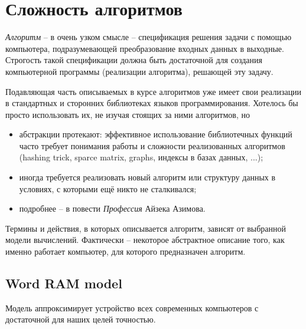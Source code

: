 \chapter{Сложность алгоритмов}

{\em Алгоритм} -- в очень узком смысле -- спецификация решения задачи с помощью компьютера, подразумевающей преобразование входных данных в выходные. Строгость такой спецификации должна быть достаточной для создания компьютерной программы (реализации алгоритма), решающей эту задачу.

Подавляющая часть описываемых в курсе алгоритмов уже имеет свои реализации в стандартных и сторонних библиотеках языков программирования. Хотелось бы просто использовать их, не изучая стоящих за ними алгоритмов, но
\begin{itemize}
  \item абстракции протекают: эффективное использование библиотечных функций часто требует понимания работы и сложности реализованных алгоритмов (hashing trick, sparce matrix, graphs, индексы в базах данных, ...);
  \item иногда требуется реализовать новый алгоритм или структуру данных в условиях, с которыми ещё никто не сталкивался;
  \item подробнее -- в повести {\em Профессия} Айзека Азимова.
\end{itemize}

Термины и действия, в которых описывается алгоритм, зависят от выбранной модели вычислений.
Фактически -- некоторое абстрактное описание того, как именно работает компьютер, для которого предназначен алгоритм.


\section{Word RAM model}

Модель аппроксимирует устройство всех современных компьютеров с достаточной для наших целей точностью.

